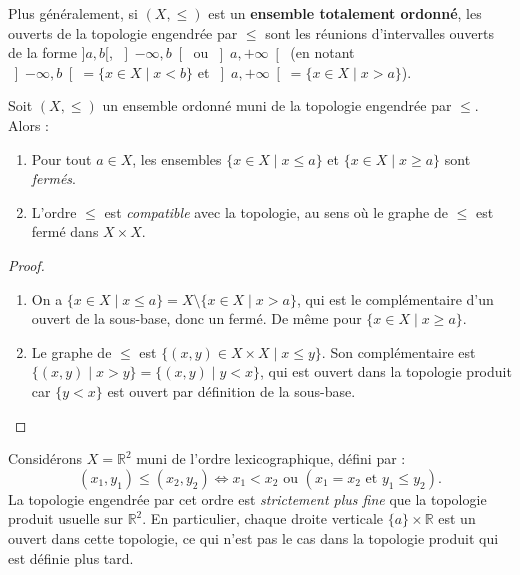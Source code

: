 \begin{exemple}
    Plus généralement, si $(X, \leq)$ est un \textbf{ensemble totalement ordonné}, les ouverts de la topologie engendrée par $\leq$ sont les réunions d'intervalles ouverts de la forme $]a, b[$, $\left]-\infty, b\right[$ ou $\left]a, +\infty\right[$ (en notant $\left]-\infty, b\right[ = \{x \in X \mid x < b\}$ et $\left]a, +\infty\right[ = \{x \in X \mid x > a\}$).
\end{exemple}


\begin{proposition}
Soit $(X, \leq)$ un ensemble ordonné muni de la topologie engendrée par $\leq$. Alors :
\begin{enumerate}
    \item Pour tout $a \in X$, les ensembles $\{x \in X \mid x \leq a\}$ et $\{x \in X \mid x \geq a\}$ sont \emph{fermés}.
    \item L'ordre $\leq$ est \emph{compatible} avec la topologie, au sens où le graphe de $\leq$ est fermé dans $X \times X$.
\end{enumerate}
\end{proposition}

\begin{proof}
\begin{enumerate}
    \item On a $\{x \in X \mid x \leq a\} = X \setminus \{x \in X \mid x > a\}$, qui est le complémentaire d'un ouvert de la sous-base, donc un fermé. De même pour $\{x \in X \mid x \geq a\}$.
    \item Le graphe de $\leq$ est $\{(x,y) \in X \times X \mid x \leq y\}$. Son complémentaire est $\{(x,y) \mid x > y\} = \{(x,y) \mid y < x\}$, qui est ouvert dans la topologie produit car $\{y < x\}$ est ouvert par définition de la sous-base. \qedhere
\end{enumerate}
\end{proof}

\begin{exemple}
    Considérons $X = \mathbb{R}^2$ muni de l'ordre lexicographique, défini par :
$$(x_1, y_1) \leq (x_2, y_2) \iff x_1 < x_2 \text{ ou } (x_1 = x_2 \text{ et } y_1 \leq y_2).$$
La topologie engendrée par cet ordre est \emph{strictement plus fine} que la topologie produit usuelle sur $\mathbb{R}^2$. En particulier, chaque droite verticale $\{a\} \times \mathbb{R}$ est un ouvert dans cette topologie, ce qui n'est pas le cas dans la topologie produit qui est définie plus tard.
\end{exemple}

